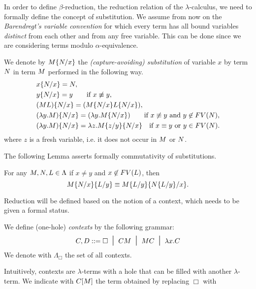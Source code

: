 \begin{THESIS}
	In order to define $\beta$-reduction, the reduction relation of the $\lambda$-calculus, we need to formally define the concept of substitution. 
	We assume from now on the \emph{Barendregt's variable convention} for which every term has all bound variables \emph{distinct} from each other and from any free variable. This can be done since we are considering terms modulo $\alpha$-equivalence.
	\begin{definition}
		We denote by $M\{N/x\}$ the \emph{(capture-avoiding) substitution} of variable $x$ by term $N$ in term $M$ performed in the following way.
		\begin{align*}
		&x\{N/x\}=N,\\
		&y\{N/x\}=y\qquad\textrm{if $x\not\equiv y$},\\
		&(ML)\{N/x\}=(M\{N/x\}L\{N/x\}),\\
		&(\lambda y.M)\{N/x\}=(\lambda y.M\{N/x\})\qquad\textrm{if $x\not\equiv y$ and $y\not\in FV(N)$},\\
		&(\lambda y.M)\{N/x\}=\lambda z.M\{z/y\}\{N/x\}\quad\textrm{if $x\equiv y$ or $y\in FV(N)$}.
		\end{align*}
		where $z$ is a fresh variable, i.e. it does not occur in $M$ or $N$.
	\end{definition}
	The following Lemma asserts formally commutativity of substitutions.
	\begin{lemma}
		For any $M,N,L\in\Lambda$ if $x\neq y$ and $x\not\in FV(L)$, then
		$$
		M\{N/x\}\{L/y\}\equiv M\{L/y\}\{N\{L/y\}/x\}.
		$$
	\end{lemma}
\end{THESIS}
Reduction will be defined based on the notion of a context, which
needs to be given a formal status.
\begin{definition}
	We define (one-hole) \emph{contexts} by the following grammar:
	$$
	C,D::=\Box\; \; \mbox{\Large{$\mid$}}\;\;CM\; \; \mbox{\Large{$\mid$}}\;\;MC\; \; \mbox{\Large{$\mid$}}\;\;\lambda x.C
	$$
	We denote with $\Lambda_\Box$ the set of all contexts.
\end{definition}
Intuitively, contexts are $\lambda$-terms with a hole that can be
filled with another $\lambda$-term. We indicate with
$C[M]$ the term obtained by replacing $\Box$ with
